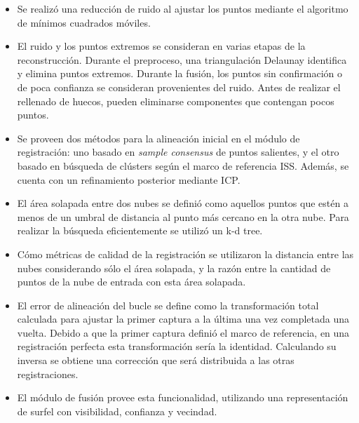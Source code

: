 		\begin{itemize}
			\item  {}
				Se realizó una reducción de ruido al ajustar los puntos
				mediante el algoritmo de mínimos cuadrados móviles.

			\item  {}
				El ruido y los puntos extremos se consideran en varias etapas de la reconstrucción.
				Durante el preproceso, una triangulación Delaunay identifica y elimina puntos extremos.
				Durante la fusión, los puntos sin confirmación o de poca confianza
				se consideran provenientes del ruido.
				Antes de realizar el rellenado de huecos, pueden eliminarse
				componentes que contengan pocos puntos.

			\item  {}
				Se proveen dos métodos para la alineación inicial en el módulo de registración:
				uno basado en \emph{sample consensus} de puntos salientes, y el otro basado en
				búsqueda de clústers según el marco de referencia ISS.
				Además, se cuenta con un refinamiento posterior mediante ICP.

			\item  {}
				El área solapada  entre dos nubes
				se definió como aquellos puntos que estén a menos de un umbral de distancia
				al punto más cercano en la otra nube.
				Para realizar la búsqueda eficientemente se utilizó un k-d tree.

			\item  {}
				Cómo métricas de calidad de la registración se utilizaron
				la distancia entre las nubes considerando sólo el área solapada,
				y la razón entre la cantidad de puntos de la nube de entrada con esta área solapada.

			\item  {}
				El error de alineación del bucle se define como la
				transformación total calculada para ajustar la primer captura a la última
				una vez completada una vuelta. Debido a que la primer captura definió el
				marco de referencia, en una registración perfecta esta
				transformación sería la identidad.
				Calculando su inversa se obtiene una corrección que será distribuida
				a las otras registraciones.

			\item  {}
				El módulo de fusión provee esta funcionalidad, utilizando una
				representación de surfel con visibilidad, confianza y vecindad.


\end{itemize}
